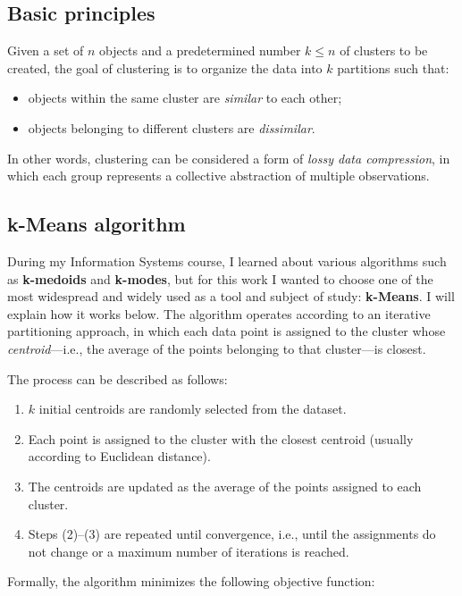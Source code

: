 \subsection{Basic principles}

Given a set of $n$ objects and a predetermined number $k \leq n$ of clusters to be created, the goal of clustering is to organize the data into $k$ partitions such that:
\begin{itemize}
  \item objects within the same cluster are \textit{similar} to each other;
  \item objects belonging to different clusters are \textit{dissimilar}.
\end{itemize}
In other words, clustering can be considered a form of \emph{lossy data compression}, in which each group represents a collective abstraction of multiple observations.

\subsection{k-Means algorithm}

During my Information Systems course, I learned about various algorithms such as \textbf{k-medoids} and \textbf{k-modes}, but for this work I wanted to choose one of the most widespread and widely used as a tool and subject of study: \textbf{k-Means}. I will explain how it works below.  
The algorithm operates according to an iterative partitioning approach, in which each data point is assigned to the cluster whose \emph{centroid}—i.e., the average of the points belonging to that cluster—is closest.  

The process can be described as follows:
\begin{enumerate}
  \item $k$ initial centroids are randomly selected from the dataset.
  \item Each point is assigned to the cluster with the closest centroid (usually according to Euclidean distance).
  \item The centroids are updated as the average of the points assigned to each cluster.
  \item Steps (2)–(3) are repeated until convergence, i.e., until the assignments do not change or a maximum number of iterations is reached.
\end{enumerate}

Formally, the algorithm minimizes the following objective function:

